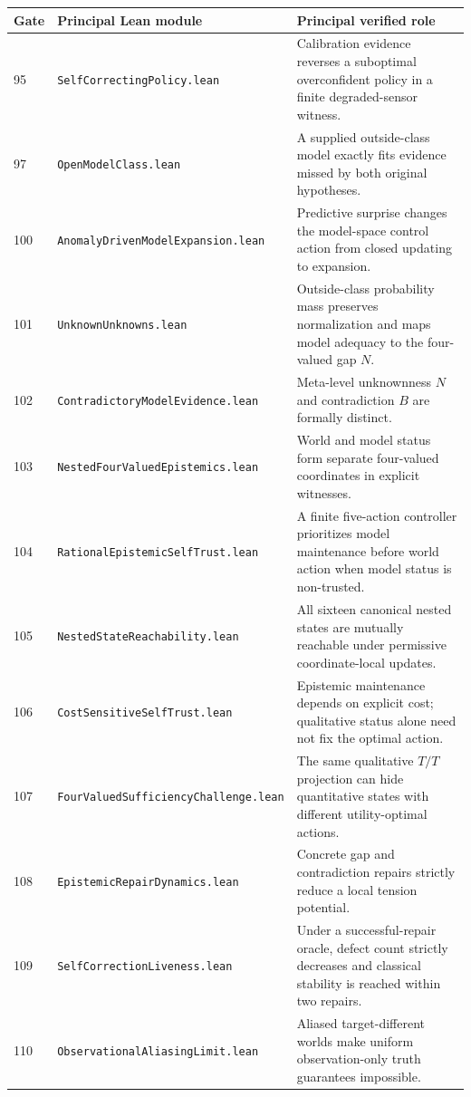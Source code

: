 \begin{center}
\small
\begin{tabularx}{\textwidth}{@{}p{}p{}X@{}}
\toprule
Gate & Principal Lean module & Principal verified role \\
\midrule
95 & \texttt{SelfCorrectingPolicy.lean} & Calibration evidence reverses a suboptimal overconfident policy in a finite degraded-sensor witness. \\
97 & \texttt{OpenModelClass.lean} & A supplied outside-class model exactly fits evidence missed by both original hypotheses. \\
100 & \texttt{AnomalyDrivenModelExpansion.lean} & Predictive surprise changes the model-space control action from closed updating to expansion. \\
101 & \texttt{UnknownUnknowns.lean} & Outside-class probability mass preserves normalization and maps model adequacy to the four-valued gap $N$. \\
102 & \texttt{ContradictoryModelEvidence.lean} & Meta-level unknownness $N$ and contradiction $B$ are formally distinct. \\
103 & \texttt{NestedFourValuedEpistemics.lean} & World and model status form separate four-valued coordinates in explicit witnesses. \\
104 & \texttt{RationalEpistemicSelfTrust.lean} & A finite five-action controller prioritizes model maintenance before world action when model status is non-trusted. \\
105 & \texttt{NestedStateReachability.lean} & All sixteen canonical nested states are mutually reachable under permissive coordinate-local updates. \\
106 & \texttt{CostSensitiveSelfTrust.lean} & Epistemic maintenance depends on explicit cost; qualitative status alone need not fix the optimal action. \\
107 & \texttt{FourValuedSufficiencyChallenge.lean} & The same qualitative $T/T$ projection can hide quantitative states with different utility-optimal actions. \\
108 & \texttt{EpistemicRepairDynamics.lean} & Concrete gap and contradiction repairs strictly reduce a local tension potential. \\
109 & \texttt{SelfCorrectionLiveness.lean} & Under a successful-repair oracle, defect count strictly decreases and classical stability is reached within two repairs. \\
110 & \texttt{ObservationalAliasingLimit.lean} & Aliased target-different worlds make uniform observation-only truth guarantees impossible. \\

\end{tabularx}
\end{center}
